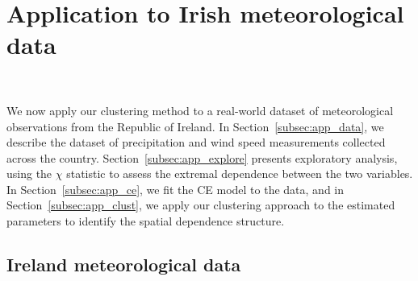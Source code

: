 \documentclass[12pt]{article}
\begin{document}
\section{Application to Irish meteorological data}~\label{sec:application}


We now apply our clustering method to a real-world dataset of meteorological observations from the Republic of Ireland. 
In Section~\ref{subsec:app_data}, we describe the dataset of precipitation and wind speed measurements collected across the country. 
Section~\ref{subsec:app_explore} presents exploratory analysis, using the $\chi$ statistic to assess the extremal dependence between the two variables. 
In Section~\ref{subsec:app_ce}, we fit the CE model to the data, and in Section~\ref{subsec:app_clust}, we apply our clustering approach to the estimated parameters to identify the spatial dependence structure. 

\subsection{Ireland meteorological data}~\label{subsec:app_data}

\end{document}
